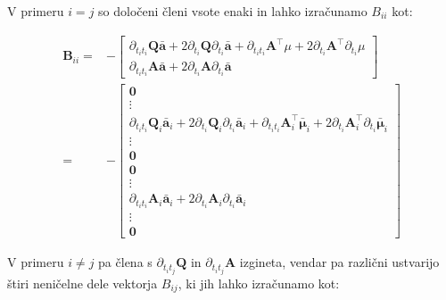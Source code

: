 \documentclass[isrm2, tisk]{fmfdelo}
\newcommand{\aimplicit}{\bar{\mathbf{a}}}
\newcommand{\muimplicit}{\bar{\boldsymbol{\mu}}}
\newcommand{\qmat}{\mathbf{Q}}
\newcommand{\amat}{\mathbf{A}}
\begin{document}
V primeru $i=j$ so določeni členi vsote enaki in lahko izračunamo $B_{ii}$ kot:

\begin{equation}
    \begin{aligned}
        \mathbf{B}_{ii} =& -\begin{bmatrix}
        \partial_{t_it_i}\qmat\aimplicit + 2\partial_{t_i}\qmat\partial_{t_i}\aimplicit + \partial_{t_it_i} \amat^{\top}\mu + 2\partial_{t_i}\amat^{\top}\partial_{t_i}\mu \\
        \partial_{t_it_i}\amat\aimplicit + 2\partial_{t_i}\amat\partial_{t_i}\aimplicit
    \end{bmatrix} \\
        =& - \begin{bmatrix}
        \mathbf{0} \\
        \vdots \\
        \partial_{t_it_i}\qmat_i\aimplicit_i + 2\partial_{t_i}\qmat_i\partial_{t_i}\aimplicit_i + \partial_{t_it_i} \amat_i^{\top}\muimplicit_i + 2\partial_{t_i}\amat_i^{\top}\partial_{t_i}\muimplicit_i \\
        \vdots \\
        \mathbf{0} \\
        \mathbf{0} \\
        \vdots \\
        \partial_{t_it_i}\amat_i\aimplicit_i + 2\partial_{t_i}\amat_i\partial_{t_i}\aimplicit_i\\
        \vdots \\
        \mathbf{0}
    \end{bmatrix}
    \end{aligned}
\end{equation}



V primeru $i \neq j$ pa člena s $\partial_{t_it_j}\qmat$ in $\partial_{t_it_j}\amat$ izgineta, vendar pa različni ustvarijo štiri neničelne dele vektorja $B_{ij}$, ki jih lahko izračunamo kot:
\end{document}
